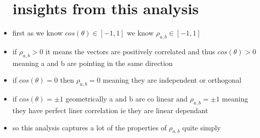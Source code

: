 \documentclass{article}
\begin{document}
\begin{itemize}
\section{insights from this analysis}
\item first as we know $cos(\theta)\in [-1,1]$ we know $\rho_{a,b}\in [-1,1]$
\item if $\rho_{a,b}>0$ it means the vectors are positively correlated and thus $cos(\theta)>0$ meaning a and b are pointing in the same direction 
\item if $cos(\theta)=0$ then $\rho_{a,b}=0$ meaning they are independent or orthogonal 
\item if $cos(\theta)=\pm 1$ geometrically a and b are co linear and $\rho_{a,b}=\pm 1$ meaning they have perfect liner correlation ie they are linear dependant
\item so this analysis captures a lot of the properties of $\rho_{a,b}$ quite simply

\end{itemize}
\end{document}
